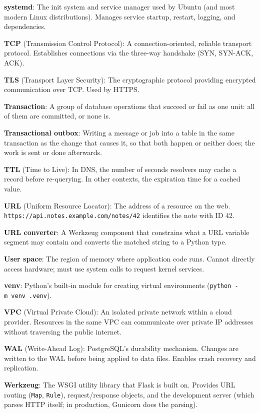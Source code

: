 \textbf{systemd}: The init system and service manager used by Ubuntu (and most modern Linux distributions). Manages service startup, restart, logging, and dependencies.

\textbf{TCP} (Transmission Control Protocol): A connection-oriented, reliable transport protocol. Establishes connections via the three-way handshake (SYN, SYN-ACK, ACK).

\textbf{TLS} (Transport Layer Security): The cryptographic protocol providing encrypted communication over TCP. Used by HTTPS.

\textbf{Transaction}: A group of database operations that succeed or fail as one unit: all of them are committed, or none is.

\textbf{Transactional outbox}: Writing a message or job into a table in the same transaction as the change that causes it, so that both happen or neither does; the work is sent or done afterwards.

\textbf{TTL} (Time to Live): In DNS, the number of seconds resolvers may cache a record before re-querying. In other contexts, the expiration time for a cached value.

\textbf{URL} (Uniform Resource Locator): The address of a resource on the web. \texttt{https:}\allowbreak{}\texttt{/}\allowbreak{}\texttt{/}\allowbreak{}\texttt{api.}\allowbreak{}\texttt{notes.}\allowbreak{}\texttt{example.}\allowbreak{}\texttt{com/}\allowbreak{}\texttt{notes/}\allowbreak{}\texttt{42} identifies the note with ID 42.

\textbf{URL converter}: A Werkzeug component that constrains what a URL variable segment may contain and converts the matched string to a Python type.

\textbf{User space}: The region of memory where application code runs. Cannot directly access hardware; must use system calls to request kernel services.

\textbf{venv}: Python's built-in module for creating virtual environments (\texttt{python\ -m\ venv\ .venv}).

\textbf{VPC} (Virtual Private Cloud): An isolated private network within a cloud provider. Resources in the same VPC can communicate over private IP addresses without traversing the public internet.

\textbf{WAL} (Write-Ahead Log): PostgreSQL's durability mechanism. Changes are written to the WAL before being applied to data files. Enables crash recovery and replication.

\textbf{Werkzeug}: The WSGI utility library that Flask is built on. Provides URL routing (\texttt{Map}, \texttt{Rule}), request/response objects, and the development server (which parses HTTP itself; in production, Gunicorn does the parsing).

